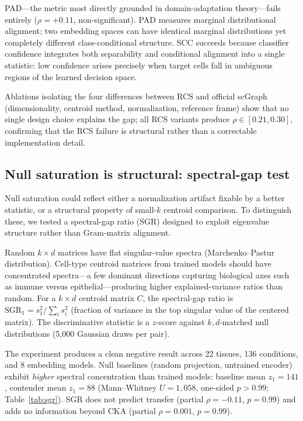 \documentclass[11pt]{article}
\begin{document}
PAD---the metric most directly grounded in domain-adaptation
theory---fails entirely ($\rho = +0.11$, non-significant). PAD
measures marginal distributional alignment; two embedding spaces can have
identical marginal distributions yet completely different class-conditional
structure. SCC succeeds because classifier confidence integrates both
separability and conditional alignment into a single statistic: low
confidence arises precisely when target cells fall in ambiguous regions
of the learned decision space.

Ablations isolating the four differences between RCS and official scGraph
(dimensionality, centroid method, normalization, reference frame) show
that no single design choice explains the gap; all RCS variants
produce $\rho \in [0.21, 0.30]$, confirming that the RCS failure is
structural rather than a correctable implementation detail.


\subsection{Null saturation is structural: spectral-gap test}
\label{sec:spectral}

Null saturation could reflect either a normalization artifact fixable by
a better statistic, or a structural property of small-$k$ centroid
comparison. To distinguish these, we tested a spectral-gap ratio (SGR)
designed to exploit eigenvalue structure rather than Gram-matrix
alignment.

Random $k \times d$ matrices have flat singular-value spectra
(Marchenko--Pastur distribution). Cell-type centroid matrices from
trained models should have concentrated spectra---a few dominant
directions capturing biological axes such as immune versus
epithelial---producing higher explained-variance ratios than random.
For a $k \times d$ centroid matrix $C$, the spectral-gap ratio is
$\mathrm{SGR}_1 = s_1^2 / \sum_i s_i^2$ (fraction of variance in the
top singular value of the centered matrix). The discriminative
statistic is a $z$-score against $k,d$-matched null distributions
(5,000 Gaussian draws per pair).

The experiment produces a clean negative result across 22 tissues,
136 conditions, and 8 embedding models. Null baselines (random
projection, untrained encoder) exhibit \emph{higher} spectral
concentration than trained models: baseline mean $z_1 = 141$,
contender mean $z_1 = 88$ (Mann--Whitney $U = 1{,}058$, one-sided
$p > 0.99$; Table~\ref{tab:sgr}). SGR does not predict transfer
(partial $\rho = -0.11$, $p = 0.99$) and adds no information beyond
CKA (partial $\rho = 0.001$, $p = 0.99$).
\end{document}

